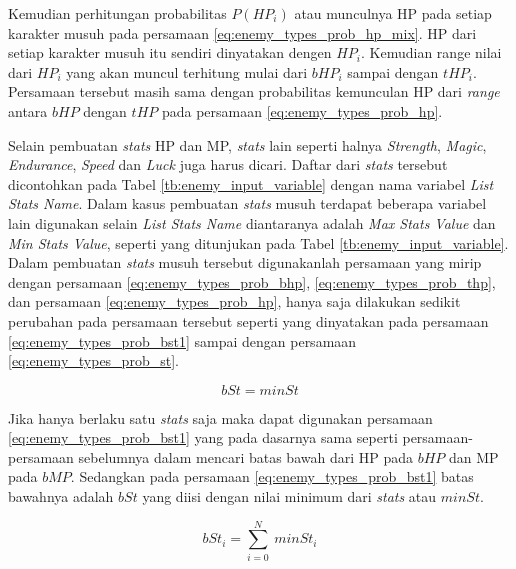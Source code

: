 Kemudian perhitungan probabilitas $P(HP_{i})$ atau munculnya HP pada setiap karakter musuh pada persamaan \ref{eq:enemy_types_prob_hp_mix}. HP dari setiap karakter musuh itu sendiri dinyatakan dengen $HP_{i}$. Kemudian range nilai dari $HP_{i}$ yang akan muncul terhitung mulai dari $bHP_{i}$ sampai dengan $tHP_{i}$. Persamaan tersebut masih sama dengan probabilitas kemunculan HP dari \textit{range} antara $bHP$ dengan $tHP$ pada persamaan \ref{eq:enemy_types_prob_hp}.
\vspace{1ex}

Selain pembuatan \textit{stats} HP dan MP, \textit{stats} lain seperti halnya \textit{Strength}, \textit{Magic}, \textit{Endurance}, \textit{Speed} dan \textit{Luck} juga harus dicari. Daftar dari \textit{stats} tersebut dicontohkan pada Tabel \ref{tb:enemy_input_variable} dengan nama variabel \textit{List Stats Name}. Dalam kasus pembuatan \textit{stats} musuh terdapat beberapa variabel lain digunakan selain \textit{List Stats Name} diantaranya adalah \textit{Max Stats Value} dan \textit{Min Stats Value}, seperti yang ditunjukan pada Tabel \ref{tb:enemy_input_variable}. Dalam pembuatan \textit{stats} musuh tersebut digunakanlah persamaan yang mirip dengan persamaan \ref{eq:enemy_types_prob_bhp}, \ref{eq:enemy_types_prob_thp}, dan persamaan \ref{eq:enemy_types_prob_hp}, hanya saja dilakukan sedikit perubahan pada persamaan tersebut seperti yang dinyatakan pada persamaan \ref{eq:enemy_types_prob_bst1} sampai dengan persamaan \ref{eq:enemy_types_prob_st}.
\vspace{-1ex}

\begin{equation}\label{eq:enemy_types_prob_bst1}
bSt = minSt
\end{equation}

Jika hanya berlaku satu \textit{stats} saja maka dapat digunakan persamaan \ref{eq:enemy_types_prob_bst1} yang pada dasarnya sama seperti persamaan-persamaan sebelumnya dalam mencari batas bawah dari HP pada $bHP$ dan MP pada $bMP$. Sedangkan pada persamaan \ref{eq:enemy_types_prob_bst1} batas bawahnya adalah $bSt$ yang diisi dengan nilai minimum dari \textit{stats} atau $minSt$.
\vspace{1ex}

\begin{equation}\label{eq:enemy_types_prob_bst2}
bSt_{i} = \sum_{i=0}^{N}\ minSt_{i}
\end{equation}

